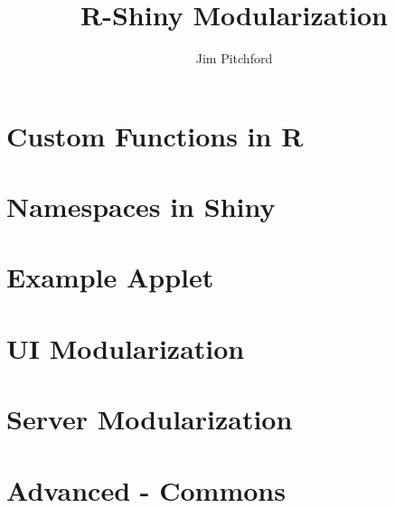 \documentclass[11pt, letterpaper]{article}
\title{R-Shiny Modularization}
\author{Jim Pitchford}
\begin{document}
\raggedright
\setlength{\parindent}{2em}




\clearpage
{}	%
\tableofcontents

\clearpage
{}
\setcounter{page}{1}

\section{Custom Functions in R}


\clearpage
\section{Namespaces in Shiny}


\clearpage
{}
\section{Example Applet}


\clearpage
{}
\section{UI Modularization}


\clearpage
\section{Server Modularization}


\clearpage
{}
\section{Advanced - Commons}

\end{document}
